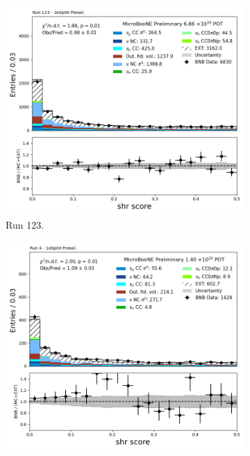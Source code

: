\begin{figure}[H]
    \centering
    \begin{subfigure}[t]{0.32\linewidth}
        \includegraphics[width=\linewidth]{technote/Appendix_Preselection/Figures/1e0p0pi/Run123/shr_score_Run123_1e0p0pi_Presel.png}
        \caption{Run 123.}
    \end{subfigure}%
    \hspace{0.2cm}%
    \begin{subfigure}[t]{0.32\linewidth}
        \includegraphics[width=\linewidth]{technote/Appendix_Preselection/Figures/1e0p0pi/Run4b/shr_score_Run4b_1e0p0pi_Presel.png}

\end{subfigure}
\end{figure}
